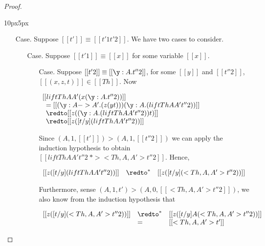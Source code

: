 \begin{proof}
\begin{changemargin}{10px}{5px}
\begin{itemize}
  \item[Case.] Suppose $[[t']] \equiv [[t'1 t'2]]$. We have two cases to consider.
    \begin{itemize}
    \item[Case.] Suppose $[[t'1]] \equiv [[x]]$ for some variable $[[x]]$. 
      \begin{itemize}
      \item[Case.] Suppose $[[t'2]] \equiv [[\y:A.t''2]]$, for some $[[y]]$ and $[[t''2]]$,
        $[[(x,z,t)]] \in [[Th]]$. 
        Now
        \begin{center}
          \begin{math}
            \begin{array}{lll}
              [[lift Th A A' (x (\y:A.t''2))]] \\
              \,\,\,= [[(\y:A->A'.(z (y t))) (\y:A.(lift Th A A' t''2))]]\\
              \,\,\,\redto [[z ((\y:A.(lift Th A A' t''2)) t)]]\\
              \,\,\,\redto [[z ([t/y](lift Th A A' t''2))]]\\
            \end{array}
          \end{math}
        \end{center}
        Since 
        $(A,1,[[t']]) > (A,1,[[t''2]])$ we can apply the induction
        hypothesis to obtain $[[lift Th A A' t''2 ~*> <Th,A,A'>t''2]]$. Hence,
        \begin{center}
          \begin{math}
            \begin{array}{lll}
              [[z ([t/y](lift Th A A' t''2))]] & \redto^* & [[z ([t/y](<Th,A,A'>t''2))]]\\
            \end{array}
          \end{math}
        \end{center}
        Furthermore, sense $(A,1,t') > (A,0,[[<Th,A,A'>t''2]])$, we also know from the induction hypothesis that 
        \begin{center}
          \begin{math}
            \begin{array}{lll}
              [[z ([t/y](<Th,A,A'>t''2))]] & \redto^* & [[z ([t/y] A (<Th,A,A'>t''2))]]\\
              & =        & [[<Th,A,A'>t']]\\
            \end{array}
          \end{math}
        \end{center}


\end{itemize}
\end{itemize}
\end{itemize}
\end{changemargin}
\end{proof}
